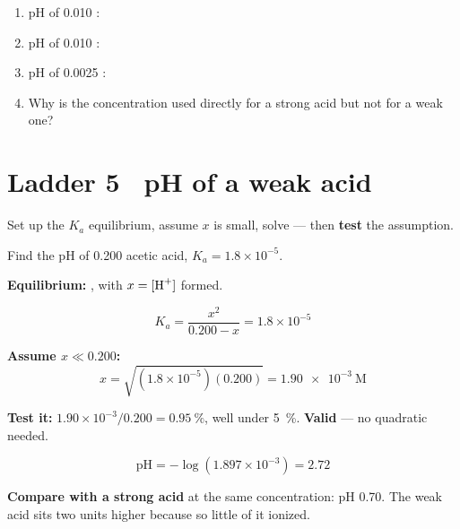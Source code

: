 \documentclass{apchem-worksheet}
\begin{document}
\begin{yourturn}
\begin{enumerate}[leftmargin=*,itemsep=0.5em]
  \item pH of \SI{0.010}{\Molar} : \workspace[1.4cm]
  \item pH of \SI{0.010}{\Molar} : \workspace[1.6cm]
  \item pH of \SI{0.0025}{\Molar} : \workspace[1.8cm]
  \item Why is the concentration used directly for a strong acid but not
        for a weak one? \workspace[1.8cm]
\end{enumerate}
\end{yourturn}

\section*{\sffamily Ladder 5 \textbullet\ pH of a weak acid}

Set up the $K_a$ equilibrium, assume $x$ is small, solve --- then
\textbf{test} the assumption.

\begin{workedexample}
Find the pH of \SI{0.200}{\Molar} acetic acid,
$K_a = 1.8\times10^{-5}$.

\textbf{Equilibrium:}
, with $x = [\ce{H+}]$ formed.

\[ K_a = \frac{x^2}{0.200 - x} = 1.8\times10^{-5} \]

\textbf{Assume $x \ll 0.200$:}
\[ x = \sqrt{(1.8\times10^{-5})(0.200)} = \num{1.90e-3}~\text{M} \]

\textbf{Test it:} $1.90\times10^{-3}/0.200 = \SI{0.95}{\percent}$, well
under \SI{5}{\percent}. \textbf{Valid} --- no quadratic needed.

\[ \text{pH} = -\log(1.897\times10^{-3}) = \mathbf{2.72} \]

\textbf{Compare with a strong acid} at the same concentration: pH
\num{0.70}. The weak acid sits two units higher because so little of it
ionized.
\end{workedexample}
\end{document}
